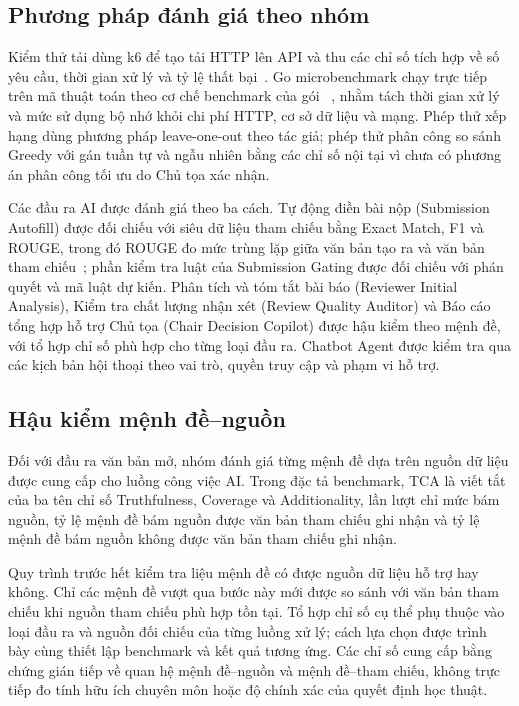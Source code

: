 \subsection{Phương pháp đánh giá theo nhóm}

Kiểm thử tải dùng k6 để tạo tải HTTP lên API và thu các chỉ số tích hợp về số yêu cầu, thời gian xử lý và tỷ lệ thất bại~\cite{ch4ref4}. Go microbenchmark chạy trực tiếp trên mã thuật toán theo cơ chế benchmark của gói ~\cite{ch4ref5}, nhằm tách thời gian xử lý và mức sử dụng bộ nhớ khỏi chi phí HTTP, cơ sở dữ liệu và mạng. Phép thử xếp hạng dùng phương pháp leave-one-out theo tác giả; phép thử phân công so sánh Greedy với gán tuần tự và ngẫu nhiên bằng các chỉ số nội tại vì chưa có phương án phân công tối ưu do Chủ tọa xác nhận.

Các đầu ra AI được đánh giá theo ba cách. Tự động điền bài nộp (Submission Autofill) được đối chiếu với siêu dữ liệu tham chiếu bằng Exact Match, F1 và ROUGE, trong đó ROUGE đo mức trùng lặp giữa văn bản tạo ra và văn bản tham chiếu~\cite{ch4ref9}; phần kiểm tra luật của Submission Gating được đối chiếu với phán quyết và mã luật dự kiến. Phân tích và tóm tắt bài báo (Reviewer Initial Analysis), Kiểm tra chất lượng nhận xét (Review Quality Auditor) và Báo cáo tổng hợp hỗ trợ Chủ tọa (Chair Decision Copilot) được hậu kiểm theo mệnh đề, với tổ hợp chỉ số phù hợp cho từng loại đầu ra. Chatbot Agent được kiểm tra qua các kịch bản hội thoại theo vai trò, quyền truy cập và phạm vi hỗ trợ.

\subsection{Hậu kiểm mệnh đề--nguồn}
\label{subsec:ch4-tca}

Đối với đầu ra văn bản mở, nhóm đánh giá từng mệnh đề dựa trên nguồn dữ liệu được cung cấp cho luồng công việc AI. Trong đặc tả benchmark, TCA là viết tắt của ba tên chỉ số Truthfulness, Coverage và Additionality, lần lượt chỉ mức bám nguồn, tỷ lệ mệnh đề bám nguồn được văn bản tham chiếu ghi nhận và tỷ lệ mệnh đề bám nguồn không được văn bản tham chiếu ghi nhận.

Quy trình trước hết kiểm tra liệu mệnh đề có được nguồn dữ liệu hỗ trợ hay không. Chỉ các mệnh đề vượt qua bước này mới được so sánh với văn bản tham chiếu khi nguồn tham chiếu phù hợp tồn tại. Tổ hợp chỉ số cụ thể phụ thuộc vào loại đầu ra và nguồn đối chiếu của từng luồng xử lý; cách lựa chọn được trình bày cùng thiết lập benchmark và kết quả tương ứng. Các chỉ số cung cấp bằng chứng gián tiếp về quan hệ mệnh đề--nguồn và mệnh đề--tham chiếu, không trực tiếp đo tính hữu ích chuyên môn hoặc độ chính xác của quyết định học thuật.

